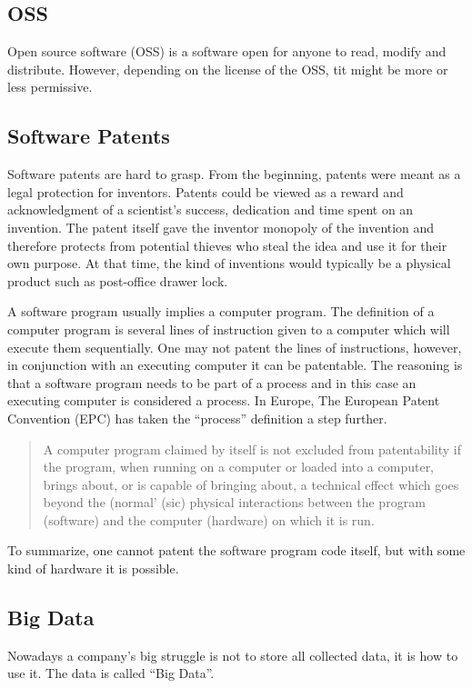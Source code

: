 \documentclass[conference]{IEEEtran}
\begin{document}
\subsection{OSS}
Open source software (OSS) is a software open for anyone to read, modify and distribute. However, depending on the license of the OSS, tit might be more or less permissive. \cite{OSS}

\subsection{Software Patents}
Software patents are hard to grasp. From the beginning, patents were meant as a legal protection for inventors. Patents could be viewed as a reward and acknowledgment of a scientist's success, dedication and time spent on an invention. The patent itself gave the inventor monopoly of the invention and therefore protects from potential thieves who steal the idea and use it for their own purpose. \cite{SoftwarePatent} At that time, the kind of inventions would typically be a physical product such as post-office drawer lock. \cite{LockPatent}

A software program usually implies a computer program. The definition of a computer program is several lines of instruction given to a computer which will execute them sequentially. One may not patent the lines of instructions, however, in conjunction with an executing computer it can be patentable. The reasoning is that a software program needs to be part of a process and in this case an executing computer is considered a process. In Europe, The European Patent Convention (EPC) has taken the ``process'' definition a step further. \cite{SoftwarePatent}
\begin{quotation}
A computer program claimed by itself is not excluded from patentability if the program, when running on a computer or loaded into a computer, brings about, or is capable of bringing about, a technical effect which goes beyond the (normal' (sic) physical interactions between the program (software) and the computer (hardware) on which it is run. \cite[p. 36]{SoftwarePatent}
\end{quotation} 

To summarize, one cannot patent the software program code itself, but with some kind of hardware it is possible.
\subsection{Big Data}
Nowadays a company's big struggle is not to store all collected data, it is how to use it. The data is called ``Big Data''. \cite{ExploitBigData}
\end{document}

